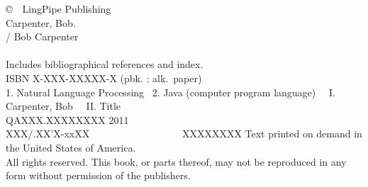 \clearpage
\pagestyle{empty}
\vspace*{1.25in}
\noindent
{\footnotesize%
\copyright \ \ LingPipe Publishing
\hfill
\vfill
\vfill
{}
\\[6pt]
Carpenter, Bob.
\\
\hspace*{0.125in}{\it Text Analysis with LingPipe 4.0} / Bob Carpenter
\\
\hspace*{.5in}{p. cm.}
\\
\hspace*{0.125in}Includes bibliographical references and index.
\\
\hspace*{0.125in}ISBN X-XXX-XXXXX-X (pbk. : alk.~paper)
\\[4pt]
1. Natural Language Processing  \ 2. Java (computer program language) \ \ I. Carpenter, Bob \ \ II. Title
\\[2pt]
\hspace*{0.125in}QAXXX.XXXXXXXX 2011
\\[2pt]
\hspace*{0.125in}XXX/.XX'X-xxXX      \ \ \ \ \ \ \ \ \ \ \ \ \ \ \ \ \  \ XXXXXXXX
\vfill
\noindent
Text printed on demand in the United States of America.
\\[12pt]
All rights reserved. This book, or parts thereof, may not
be reproduced in any form without permission of the publishers.
}

